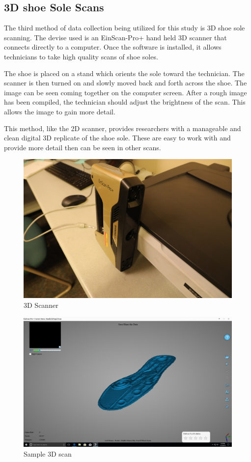 \subsection{3D shoe Sole Scans}

   The third method of data collection being utilized for this study is 3D shoe sole scanning. The devise used is an EinScan-Pro+ hand held 3D scanner that connects directly to a computer. Once the software is installed, it allows technicians to take high quality scans of shoe soles. 
   
   The shoe is placed on a stand which orients the sole toward the technician. The scanner is then turned on and slowly moved back and forth across the shoe. The image can be seen coming together on the computer screen. After a rough image has been compiled, the technician should adjust the brightness of the scan. This allows the image to gain more detail. 
   
   This method, like the 2D scanner, provides researchers with a manageable and clean digital 3D replicate of the shoe sole. These are easy to work with and provide more detail then can be seen in other scans. 
   
   \begin{figure}[!htp]
\centering
\includegraphics[width=12cm]{3D_Scanner}
\caption{3D Scanner}
\label{Image 10}
\end{figure}

\begin{figure}[!htp]
\centering
\includegraphics[width=12cm]{3D_Adidas}
\caption{Sample 3D scan}
\label{Image 11}
\end{figure}

